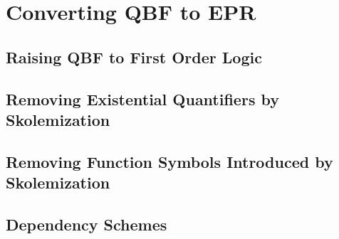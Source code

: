 \chapter{Converting QBF to EPR}

\section{Raising QBF to First Order Logic}

\section{Removing Existential Quantifiers by Skolemization}

\section{Removing Function Symbols Introduced by Skolemization}

\section{Dependency Schemes}
